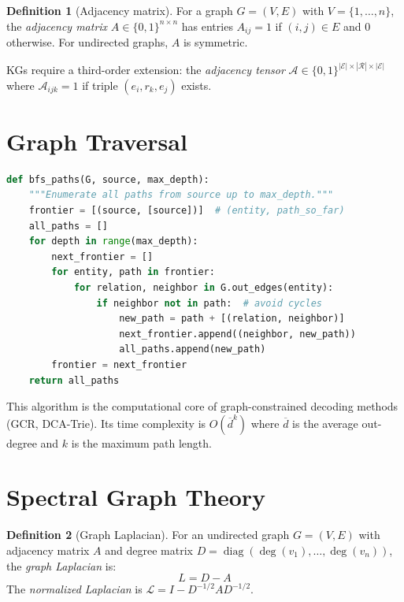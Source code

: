 \documentclass[11pt,a4paper,oneside,openany]{book}
\theoremstyle{definition}
\newtheorem{definition}{Definition}[chapter]
\theoremstyle{plain}
\theoremstyle{remark}
\newcommand{\cE}{\mathcal{E}}
\newcommand{\cR}{\mathcal{R}}
\begin{document}
\begin{definition}[Adjacency matrix]
	For a graph $G = (V, E)$ with $V = \{1, \dots, n\}$, the \emph{adjacency matrix} $A \in \{0,1\}^{n \times n}$ has entries $A_{ij} = 1$ if $(i,j) \in E$ and $0$ otherwise. For undirected graphs, $A$ is symmetric.
\end{definition}

KGs require a third-order extension: the \emph{adjacency tensor} $\mathcal{A} \in \{0,1\}^{|\cE| \times |\cR| \times |\cE|}$ where $\mathcal{A}_{ijk} = 1$ if triple $(e_i, r_k, e_j)$ exists.

\section{Graph Traversal}\label{sec:traversal}

\begin{algorithm}[h]
	\caption{BFS for KG path enumeration}
	\label{alg:bfs-kg}
	\begin{lstlisting}[language=Python,frame=single,numbers=none]
def bfs_paths(G, source, max_depth):
    """Enumerate all paths from source up to max_depth."""
    frontier = [(source, [source])]  # (entity, path_so_far)
    all_paths = []
    for depth in range(max_depth):
        next_frontier = []
        for entity, path in frontier:
            for relation, neighbor in G.out_edges(entity):
                if neighbor not in path:  # avoid cycles
                    new_path = path + [(relation, neighbor)]
                    next_frontier.append((neighbor, new_path))
                    all_paths.append(new_path)
        frontier = next_frontier
    return all_paths
\end{lstlisting}
\end{algorithm}

This algorithm is the computational core of graph-constrained decoding methods (GCR, DCA-Trie). Its time complexity is $O(\overline{d}^k)$ where $\overline{d}$ is the average out-degree and $k$ is the maximum path length.

\section{Spectral Graph Theory}\label{sec:spectral}

\begin{definition}[Graph Laplacian]
	For an undirected graph $G = (V, E)$ with adjacency matrix $A$ and degree matrix $D = \operatorname{diag}(\deg(v_1), \dots, \deg(v_n))$, the \emph{graph Laplacian} is:
	$$L = D - A$$
	The \emph{normalized Laplacian} is $\mathcal{L} = I - D^{-1/2} A D^{-1/2}$.
\end{definition}
\end{document}
